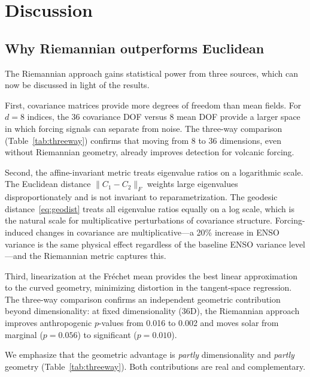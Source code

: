 \documentclass[preprint,12pt]{elsarticle}
\newcommand{\pval}{p}
\begin{document}
\section{Discussion}\label{sec:discussion}

\subsection{Why Riemannian outperforms Euclidean}\label{sec:whyriemann}

The Riemannian approach gains statistical power from three sources, which can now be discussed in light of the results.

First, covariance matrices provide more degrees of freedom than mean fields.
For $d=8$ indices, the 36 covariance DOF versus 8 mean DOF provide a larger space in which forcing signals can separate from noise.
The three-way comparison (Table~\ref{tab:threeway}) confirms that moving from 8 to 36 dimensions, even without Riemannian geometry, already improves detection for volcanic forcing.

Second, the affine-invariant metric treats eigenvalue ratios on a logarithmic scale.
The Euclidean distance $\|C_1 - C_2\|_F$ weights large eigenvalues disproportionately and is not invariant to reparametrization.
The geodesic distance~\eqref{eq:geodist} treats all eigenvalue ratios equally on a log scale, which is the natural scale for multiplicative perturbations of covariance structure.
Forcing-induced changes in covariance are multiplicative---a 20\% increase in ENSO variance is the same physical effect regardless of the baseline ENSO variance level---and the Riemannian metric captures this.

Third, linearization at the Fr\'{e}chet mean provides the best linear approximation to the curved geometry, minimizing distortion in the tangent-space regression.
The three-way comparison confirms an independent geometric contribution beyond dimensionality: at fixed dimensionality (36D), the Riemannian approach improves anthropogenic $p$-values from 0.016 to 0.002 and moves solar from marginal ($\pval = 0.056$) to significant ($\pval = 0.010$).

We emphasize that the geometric advantage is \emph{partly} dimensionality and \emph{partly} geometry (Table~\ref{tab:threeway}).
Both contributions are real and complementary.
\end{document}
